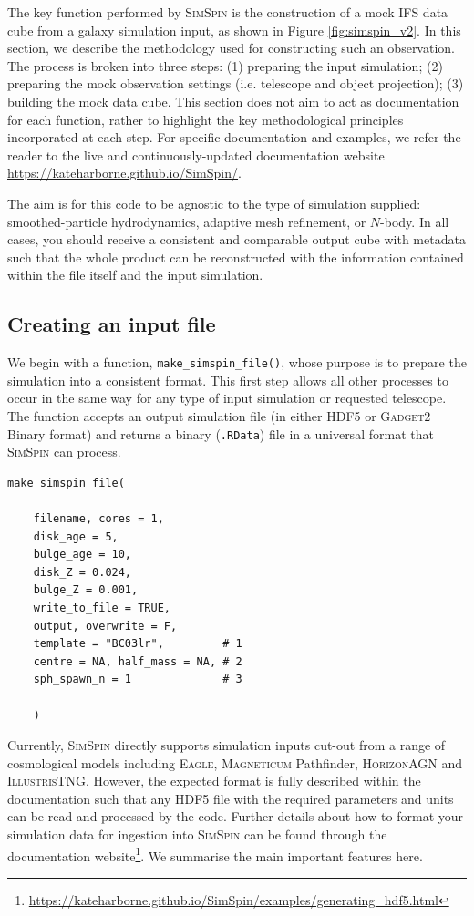 \documentclass[
  journal=pasa,
  manuscript=research-paper, %
  year=2020,
  volume=37,
]{cup-journal}
\newcommand{\simspin}[1]{\textsc{SimSpin}#1} %
\newcommand{\eagle}[1]{\textsc{Eagle}#1} %
\newcommand{\magneticum}[1]{\textsc{Magneticum}#1} %
\newcommand{\illustristng}[1]{\textsc{IllustrisTNG}#1} %
\newcommand{\horizon}[1]{\textsc{HorizonAGN}#1} %
\newcommand{\gadget}[1]{\textsc{Gadget2}#1} %
\newcommand{\makesimspinfile}[1]{\texttt{make\_simspin\_file()}#1}
\begin{document}
The key function performed by \simspin{} is the construction of a mock IFS data cube from a galaxy simulation input, as shown in Figure \ref{fig:simspin_v2}. 
In this section, we describe the methodology used for constructing such an observation. 
The process is broken into three steps: (1) preparing the input simulation; (2) preparing the mock observation settings (i.e. telescope and object projection); (3) building the mock data cube. 
This section does not aim to act as documentation for each function, rather to highlight the key methodological principles incorporated at each step. 
For specific documentation and examples, we refer the reader to the live and continuously-updated documentation website \url{https://kateharborne.github.io/SimSpin/}.

The aim is for this code to be agnostic to the type of simulation supplied: smoothed-particle hydrodynamics, adaptive mesh refinement, or $N$-body. 
In all cases, you should receive a consistent and comparable output cube with metadata such that the whole product can be reconstructed with the information contained within the file itself and the input simulation.

\subsection{Creating an input file} \label{sec:make_simspin_file}

We begin with a function, \makesimspinfile, whose purpose is to prepare the simulation into a consistent format. 
This first step allows all other processes to occur in the same way for any type of input simulation or requested telescope.
The function accepts an output simulation file (in either HDF5 or \gadget{} Binary format) and returns a binary (\texttt{.RData}) file in a universal format that \simspin{} can process.

\begin{lstlisting}[basicstyle=\fontsize{10}{8}\selectfont\ttfamily]
make_simspin_file(

    filename, cores = 1,
    disk_age = 5, 
    bulge_age = 10,
    disk_Z = 0.024, 
    bulge_Z = 0.001,
    write_to_file = TRUE, 
    output, overwrite = F,
    template = "BC03lr",         # 1
    centre = NA, half_mass = NA, # 2
    sph_spawn_n = 1              # 3
    
    )
\end{lstlisting}

Currently, \simspin{} directly supports simulation inputs cut-out from a range of cosmological models including \eagle{}, \magneticum{} Pathfinder, \horizon{} and \illustristng. 
However, the expected format is fully described within the documentation such that any HDF5 file with the required parameters and units can be read and processed by the code. 
Further details about how to format your simulation data for ingestion into \simspin{} can be found through the documentation website\footnote{\url{https://kateharborne.github.io/SimSpin/examples/generating_hdf5.html}}.
We summarise the main important features here. 
\end{document}

